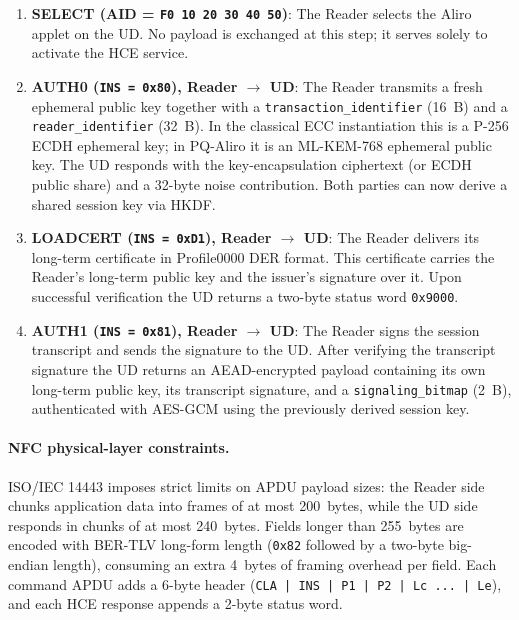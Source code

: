 \begin{enumerate}
  \item \textbf{SELECT (AID = \texttt{F0\,10\,20\,30\,40\,50})}: The Reader
        selects the Aliro applet on the UD.  No payload is exchanged at this
        step; it serves solely to activate the HCE service.

  \item \textbf{AUTH0 (\texttt{INS = 0x80}), Reader $\to$ UD}: The Reader
        transmits a fresh ephemeral public key together with a
        \texttt{transaction\_identifier} (16~B) and a \texttt{reader\_identifier}
        (32~B).  In the classical ECC instantiation this is a P-256 ECDH
        ephemeral key; in PQ-Aliro it is an ML-KEM-768 ephemeral public key.
        The UD responds with the key-encapsulation ciphertext (or ECDH public
        share) and a 32-byte noise contribution.  Both parties can now derive a
        shared session key via HKDF.

  \item \textbf{LOADCERT (\texttt{INS = 0xD1}), Reader $\to$ UD}: The Reader
        delivers its long-term certificate in Profile0000 DER format.  This
        certificate carries the Reader's long-term public key and the issuer's
        signature over it.  Upon successful verification the UD returns a
        two-byte status word \texttt{0x9000}.

  \item \textbf{AUTH1 (\texttt{INS = 0x81}), Reader $\to$ UD}: The Reader
        signs the session transcript and sends the signature to the UD.  After
        verifying the transcript signature the UD returns an AEAD-encrypted
        payload containing its own long-term public key, its transcript
        signature, and a \texttt{signaling\_bitmap} (2~B), authenticated with
        AES-GCM using the previously derived session key.
\end{enumerate}

\paragraph{NFC physical-layer constraints.}
ISO/IEC 14443 imposes strict limits on APDU payload sizes: the Reader side
chunks application data into frames of at most 200~bytes, while the UD side
responds in chunks of at most 240~bytes.  Fields longer than 255~bytes are
encoded with BER-TLV long-form length (\texttt{0x82} followed by a two-byte
big-endian length), consuming an extra 4~bytes of framing overhead per field.
Each command APDU adds a 6-byte header
(\texttt{CLA\,|\,INS\,|\,P1\,|\,P2\,|\,Lc\,...\,|\,Le}), and each HCE response
appends a 2-byte status word.

